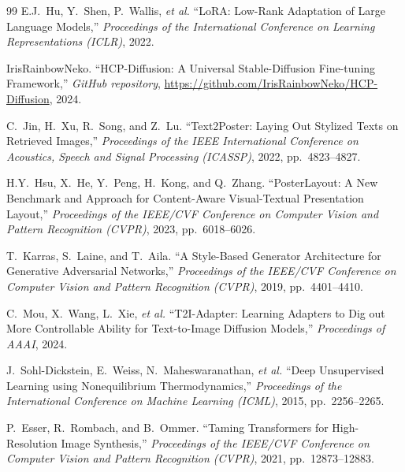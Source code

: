 \documentclass[10pt,a4paper]{article}
\begin{document}
\begin{thebibliography}{99}
E.J.~Hu, Y.~Shen, P.~Wallis, \emph{et al.}
``LoRA: Low-Rank Adaptation of Large Language Models,''
\emph{Proceedings of the International Conference on Learning Representations (ICLR)}, 2022.

IrisRainbowNeko.
``HCP-Diffusion: A Universal Stable-Diffusion Fine-tuning Framework,''
\emph{GitHub repository}, \url{https://github.com/IrisRainbowNeko/HCP-Diffusion}, 2024.

C.~Jin, H.~Xu, R.~Song, and Z.~Lu.
``Text2Poster: Laying Out Stylized Texts on Retrieved Images,''
\emph{Proceedings of the IEEE International Conference on Acoustics, Speech and Signal Processing (ICASSP)}, 2022, pp.~4823--4827.

H.Y.~Hsu, X.~He, Y.~Peng, H.~Kong, and Q.~Zhang.
``PosterLayout: A New Benchmark and Approach for Content-Aware Visual-Textual Presentation Layout,''
\emph{Proceedings of the IEEE/CVF Conference on Computer Vision and Pattern Recognition (CVPR)}, 2023, pp.~6018--6026.

T.~Karras, S.~Laine, and T.~Aila.
``A Style-Based Generator Architecture for Generative Adversarial Networks,''
\emph{Proceedings of the IEEE/CVF Conference on Computer Vision and Pattern Recognition (CVPR)}, 2019, pp.~4401--4410.

C.~Mou, X.~Wang, L.~Xie, \emph{et al.}
``T2I-Adapter: Learning Adapters to Dig out More Controllable Ability for Text-to-Image Diffusion Models,''
\emph{Proceedings of AAAI}, 2024.

J.~Sohl-Dickstein, E.~Weiss, N.~Maheswaranathan, \emph{et al.}
``Deep Unsupervised Learning using Nonequilibrium Thermodynamics,''
\emph{Proceedings of the International Conference on Machine Learning (ICML)}, 2015, pp.~2256--2265.

P.~Esser, R.~Rombach, and B.~Ommer.
``Taming Transformers for High-Resolution Image Synthesis,''
\emph{Proceedings of the IEEE/CVF Conference on Computer Vision and Pattern Recognition (CVPR)}, 2021, pp.~12873--12883.

\end{thebibliography}
\end{document}
